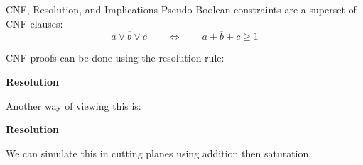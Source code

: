 \documentclass[aspectratio=169,compress,10pt]{beamer}
\begin{document}
\begin{frame}{CNF, Resolution, and Implications}
    Pseudo-Boolean constraints are a superset of CNF clauses:
    \begin{equation*}
        a \lor \overline{b} \lor c \qquad \Leftrightarrow \qquad a + \overline{b} + c \ge 1
    \end{equation*}

    CNF proofs can be done using the resolution rule:\bigskip

    \begin{minipage}[c]{0.35\framewidth}
        \textcolor{uofgcobalt}{\textbf{Resolution}}
    \end{minipage}\hfill\begin{minipage}[c]{0.60\framewidth}\begin{prooftree}
    \end{prooftree}\end{minipage}\bigskip

    Another way of viewing this is:\bigskip

    \begin{minipage}[c]{0.35\framewidth}
        \textcolor{uofgcobalt}{\textbf{Resolution}}
    \end{minipage}\hfill\begin{minipage}[c]{0.60\framewidth}\begin{prooftree}
    \end{prooftree}\end{minipage}\bigskip

    We can simulate this in cutting planes using addition then saturation.
\end{frame}
\end{document}
